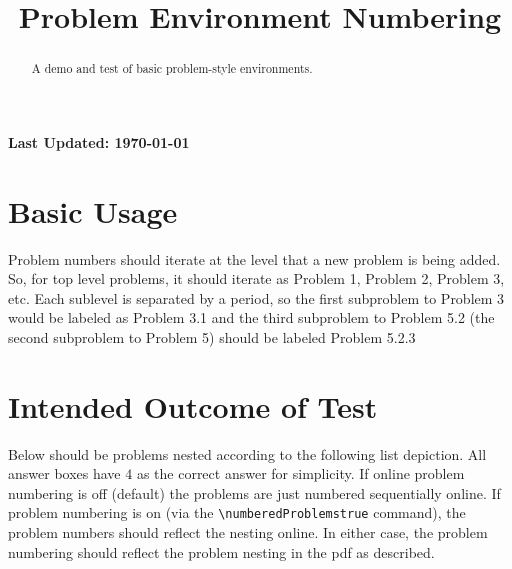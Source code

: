 \documentclass{ximera}
\title{Problem Environment Numbering}
\begin{document}
\begin{abstract}
    A demo and test of basic problem-style environments.
\end{abstract}
\maketitle

{{\Huge \bfseries Last Updated: \today}} \\

\section{Basic Usage}
Problem numbers should iterate at the level that a new problem is being added. So, for top level problems, it should iterate as
Problem 1, Problem 2, Problem 3, etc. Each sublevel is separated by a period, so the first subproblem to Problem 3 would be
labeled as Problem 3.1 and the third subproblem to Problem 5.2 (the second subproblem to Problem 5) should be labeled Problem 5.2.3

\section{Intended Outcome of Test}
Below should be problems nested according to the following list depiction. All answer boxes have $4$ as the correct answer for simplicity.
If online problem numbering is off (default) the problems are just numbered sequentially online. 
If problem numbering is on (via the \verb|\numberedProblemstrue| command), the problem numbers should reflect the nesting online.
In either case, the problem numbering should reflect the problem nesting in the pdf as described.
\end{document}
